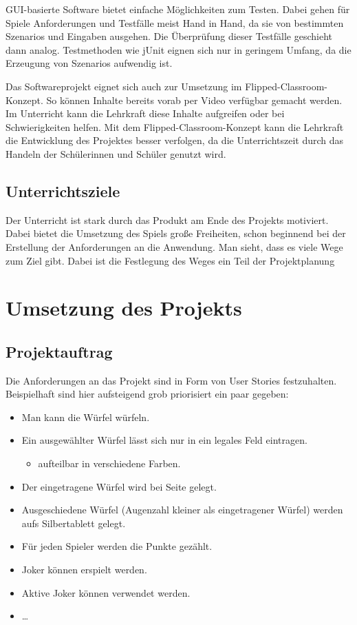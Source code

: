 \documentclass[a4paper,12pt]{article}
\newcommand{\sus}{Schülerinnen und Schüler}
\begin{document}
    GUI-basierte Software bietet einfache Möglichkeiten zum Testen.
    Dabei gehen für Spiele Anforderungen und Testfälle meist Hand in Hand, 
    da sie von bestimmten Szenarios und Eingaben ausgehen.
    Die Überprüfung dieser Testfälle geschieht dann analog. 
    Testmethoden wie jUnit eignen sich nur in geringem Umfang, 
    da die Erzeugung von Szenarios aufwendig ist.

    Das Softwareprojekt eignet sich auch zur Umsetzung im Flipped-Classroom-Konzept.
    So können Inhalte bereits vorab per Video verfügbar gemacht werden.
    Im Unterricht kann die Lehrkraft diese Inhalte aufgreifen oder bei Schwierigkeiten helfen.
    Mit dem Flipped-Classroom-Konzept kann die Lehrkraft die Entwicklung des Projektes besser verfolgen,
    da die Unterrichtszeit durch das Handeln der \sus{} genutzt wird.


\subsection{Unterrichtsziele}

    Der Unterricht ist stark durch das Produkt am Ende des Projekts motiviert. 
    Dabei bietet die Umsetzung des Spiels große Freiheiten, 
    schon beginnend bei der Erstellung der Anforderungen an die Anwendung.
    Man sieht, dass es viele Wege zum Ziel gibt.
    Dabei ist die Festlegung des Weges ein Teil der Projektplanung


\section{Umsetzung des Projekts}

\subsection{Projektauftrag}
    Die Anforderungen an das Projekt sind in Form von User Stories festzuhalten.
    Beispielhaft sind hier aufsteigend grob priorisiert ein paar gegeben:
    \begin{itemize}
        \item Man kann die Würfel würfeln.
        \item Ein ausgewählter Würfel lässt sich nur in ein legales Feld eintragen.
        \begin{itemize}
            \item aufteilbar in verschiedene Farben.
        \end{itemize}
        \item Der eingetragene Würfel wird bei Seite gelegt.
        \item Ausgeschiedene Würfel (Augenzahl kleiner als eingetragener Würfel) werden aufs Silbertablett gelegt.
        \item Für jeden Spieler werden die Punkte gezählt.
        \item Joker können erspielt werden.
        \item Aktive Joker können verwendet werden.
        \item \dots
    \end{itemize}
\end{document}
